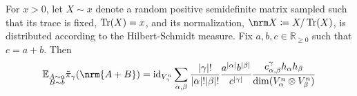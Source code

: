 \documentclass[notitlepage, 10pt]{article}
\begin{document}
\begin{cor}
    For $x > 0 $, let $X \sim x$ denote a random positive semidefinite matrix sampled such that its trace is fixed, $\operatorname{Tr}(X) = x$, and its normalization, $\nrm X \coloneqq X/\Tr(X)$, is distributed according to the Hilbert-Schmidt measure.
    Fix $a,b,c \in \mathbb R_{\geq 0}$ such that $c=a+b$.
    Then
    \begin{equation}
        \mathbb E_{\substack{A \sim a \\ B \sim b}} \tilde \pi_{\yc}(\nrm{A+B}) 
        = \id_{V_{\yc}^n} \sum_{\ya,\yb} \frac{{\syc}!}{{\sya}!{\syb}!} 
        \frac{a^{{\sya}}b^{{\syb}}}{c^{{\syc}}}
        \frac{c^{\yc}_{\ya,\yb}h_{\ya}h_{\yb}}{\dim(V_{\ya}^n \ot V_{\yb}^n)} 
    \end{equation}
\end{cor}
\end{document}
